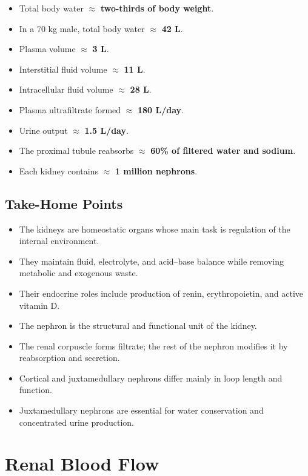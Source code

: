 \documentclass[11pt,a4paper]{article}
\begin{document}
\begin{itemize}
    \item Total body water \(\approx\) \textbf{two-thirds of body weight}.
    \item In a 70 kg male, total body water \(\approx\) \textbf{42 L}.
    \item Plasma volume \(\approx\) \textbf{3 L}.
    \item Interstitial fluid volume \(\approx\) \textbf{11 L}.
    \item Intracellular fluid volume \(\approx\) \textbf{28 L}.
    \item Plasma ultrafiltrate formed \(\approx\) \textbf{180 L/day}.
    \item Urine output \(\approx\) \textbf{1.5 L/day}.
    \item The proximal tubule reabsorbs \(\approx\) \textbf{60\% of filtered water and sodium}.
    \item Each kidney contains \(\approx\) \textbf{1 million nephrons}.
\end{itemize}

\subsection{Take-Home Points}

\begin{itemize}
    \item The kidneys are homeostatic organs whose main task is regulation of the internal environment.
    \item They maintain fluid, electrolyte, and acid--base balance while removing metabolic and exogenous waste.
    \item Their endocrine roles include production of renin, erythropoietin, and active vitamin D.
    \item The nephron is the structural and functional unit of the kidney.
    \item The renal corpuscle forms filtrate; the rest of the nephron modifies it by reabsorption and secretion.
    \item Cortical and juxtamedullary nephrons differ mainly in loop length and function.
    \item Juxtamedullary nephrons are essential for water conservation and concentrated urine production.
\end{itemize}

\section{Renal Blood Flow}
\end{document}
